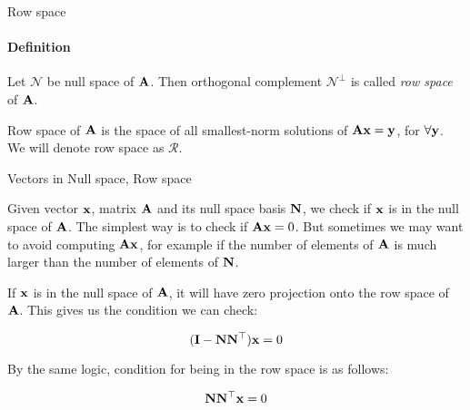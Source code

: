 \documentclass{beamer}
\begin{document}
\begin{frame}{Row space}
	\framesubtitle{Definition}
	\begin{flushleft}
		
		\begin{definition}
			Let $\mathcal{N}$ be null space of $\mathbf{A}$. Then orthogonal complement $\mathcal{N}^\perp$ is called \emph{row space} of $\mathbf{A}$.
		\end{definition}
	
		\bigskip
		
		Row space of $\mathbf{A}$ is the space of all smallest-norm solutions of $\mathbf{A}\mathbf{x} = \mathbf{y}$, for $\forall \mathbf{y}$. We will denote row space as $\mathcal{R}$.
		
	\end{flushleft}
\end{frame}




\begin{frame}{Vectors in Null space, Row space}
	\begin{flushleft}
		
		Given vector $\mathbf{x}$, matrix $\mathbf{A}$ and its null space basis $\mathbf{N}$, we check if $\mathbf{x}$ is in the null space of $\mathbf{A}$. The simplest way is to check if $\mathbf{A}\mathbf{x} = 0$. But sometimes we may want to avoid computing $\mathbf{A}\mathbf{x}$, for example if the number of elements of $\mathbf{A}$ is much larger than the number of elements of $\mathbf{N}$.
		
		\bigskip
		
		If $\mathbf{x}$ is in the null space of $\mathbf{A}$, it will have zero projection onto the row space of $\mathbf{A}$. This gives us the condition we can check:
		
		\begin{equation}
			(\mathbf{I} - \mathbf{N} \mathbf{N}^\top) \mathbf{x} = 0
		\end{equation}
		
		By the same logic, condition for being in the row space is as follows:
		
		\begin{equation}
			\mathbf{N} \mathbf{N}^\top \mathbf{x} = 0
		\end{equation}
		
		
	\end{flushleft}
\end{frame}
\end{document}
